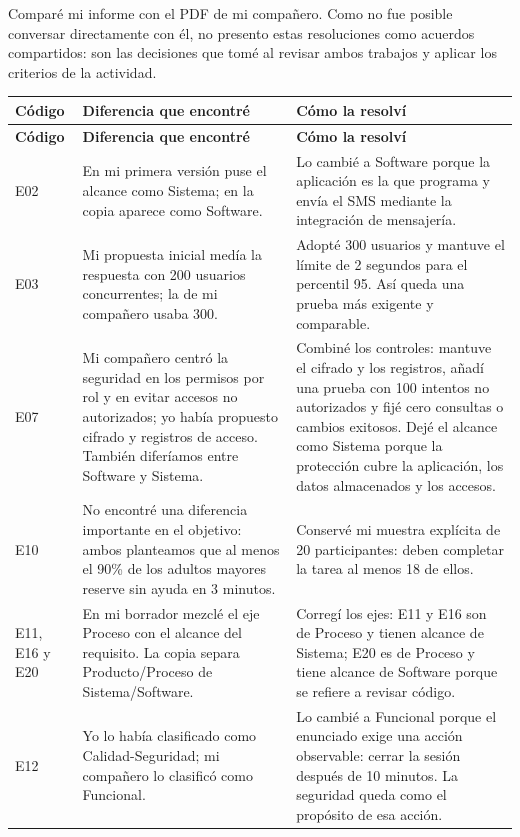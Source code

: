 \documentclass[10pt,letterpaper,landscape]{article}
\begin{document}
Comparé mi informe con el PDF de mi compañero. Como no fue posible conversar directamente con él, no presento estas resoluciones como acuerdos compartidos: son las decisiones que tomé al revisar ambos trabajos y aplicar los criterios de la actividad.

\small
\begin{longtable}{@{}p{0.50in}p{3.18in}p{5.55in}@{}}
\toprule
\rowcolor{azulclaro}
\textbf{Código} & \textbf{Diferencia que encontré} & \textbf{Cómo la resolví} \\
\midrule
\endfirsthead
\toprule
\rowcolor{azulclaro}
\textbf{Código} & \textbf{Diferencia que encontré} & \textbf{Cómo la resolví} \\
\midrule
\endhead
\bottomrule
\endlastfoot
E02 & En mi primera versión puse el alcance como Sistema; en la copia aparece como Software. & Lo cambié a Software porque la aplicación es la que programa y envía el SMS mediante la integración de mensajería. \\
E03 & Mi propuesta inicial medía la respuesta con 200 usuarios concurrentes; la de mi compañero usaba 300. & Adopté 300 usuarios y mantuve el límite de 2 segundos para el percentil 95. Así queda una prueba más exigente y comparable. \\
E07 & Mi compañero centró la seguridad en los permisos por rol y en evitar accesos no autorizados; yo había propuesto cifrado y registros de acceso. También diferíamos entre Software y Sistema. & Combiné los controles: mantuve el cifrado y los registros, añadí una prueba con 100 intentos no autorizados y fijé cero consultas o cambios exitosos. Dejé el alcance como Sistema porque la protección cubre la aplicación, los datos almacenados y los accesos. \\
E10 & No encontré una diferencia importante en el objetivo: ambos planteamos que al menos el 90\% de los adultos mayores reserve sin ayuda en 3 minutos. & Conservé mi muestra explícita de 20 participantes: deben completar la tarea al menos 18 de ellos. \\
E11, E16 y E20 & En mi borrador mezclé el eje Proceso con el alcance del requisito. La copia separa Producto/Proceso de Sistema/Software. & Corregí los ejes: E11 y E16 son de Proceso y tienen alcance de Sistema; E20 es de Proceso y tiene alcance de Software porque se refiere a revisar código. \\
E12 & Yo lo había clasificado como Calidad-Seguridad; mi compañero lo clasificó como Funcional. & Lo cambié a Funcional porque el enunciado exige una acción observable: cerrar la sesión después de 10 minutos. La seguridad queda como el propósito de esa acción. \\

\end{longtable}
\end{document}
